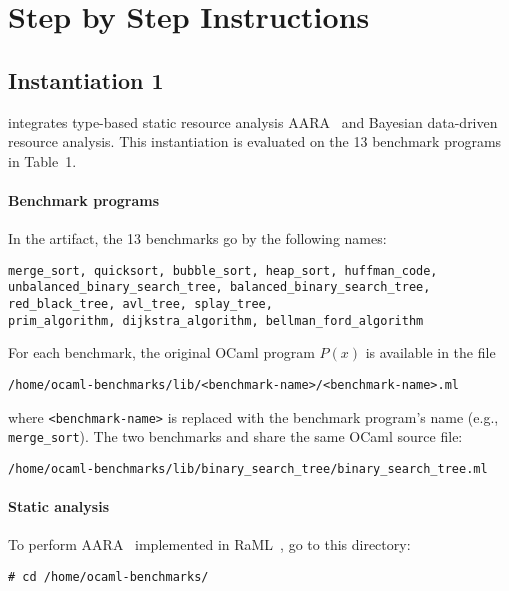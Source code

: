 
\section{Step by Step Instructions}
\label{sec:step-by-step-instructions}

\subsection{Instantiation 1}
\label{sec:step-by-step-instructions:instantiation-1}

 integrates type-based static resource
analysis AARA~\citep{Hoffmann2011a,Hoffmann2017} and Bayesian data-driven
resource analysis.
%
This instantiation is evaluated on the 13 benchmark programs in Table~1.

\paragraph{Benchmark programs}

In the artifact, the 13 benchmarks go by the following names:
\begin{verbatim}
merge_sort, quicksort, bubble_sort, heap_sort, huffman_code,
unbalanced_binary_search_tree, balanced_binary_search_tree,
red_black_tree, avl_tree, splay_tree,
prim_algorithm, dijkstra_algorithm, bellman_ford_algorithm
\end{verbatim}
%
For each benchmark, the original OCaml program $P(x)$ is available in the file
\begin{verbatim}
/home/ocaml-benchmarks/lib/<benchmark-name>/<benchmark-name>.ml
\end{verbatim}
where \texttt{<benchmark-name>} is replaced with the benchmark program's name
(e.g., \texttt{merge\_sort}).
%
The two benchmarks \unbalancedbst{} and \balancedbst{} share the same OCaml
source file:
\begin{verbatim}
/home/ocaml-benchmarks/lib/binary_search_tree/binary_search_tree.ml
\end{verbatim}

\paragraph{Static analysis}

To perform AARA~\citep{Hoffmann2011a,Hoffmann2017} implemented in
RaML~\citep{RaML}, go to this directory:
\begin{verbatim}
# cd /home/ocaml-benchmarks/
\end{verbatim}

